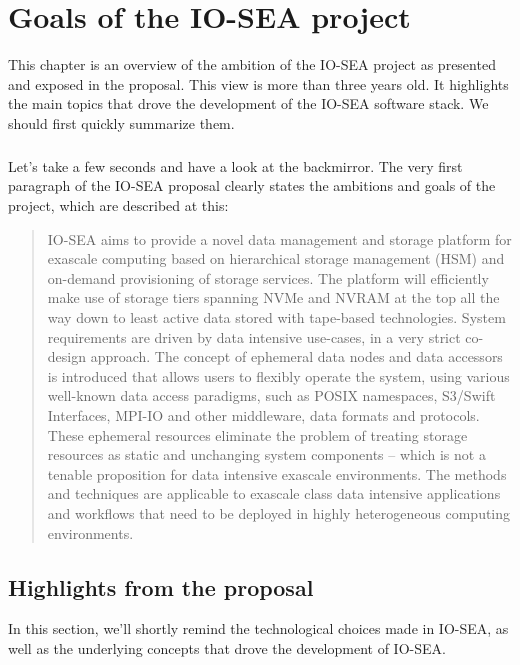 \chapter{Goals of the IO-SEA project}\label{chap:goals}

This chapter is an overview of the ambition of the IO-SEA project as presented and exposed in the proposal.
This view is more than three years old. It highlights the main topics that drove the development of the IO-SEA
software stack. We should first quickly summarize them. 

\paragraph{}
Let's take a few seconds and have a look at the backmirror. The very first paragraph of the IO-SEA proposal 
clearly states the ambitions and goals of the project, which are described at this:

\begin{quotation}
IO-SEA aims to provide a novel data management and storage platform for exascale computing based on hierarchical
storage management (HSM) and on-demand provisioning of storage services. The platform will efficiently make use
of storage tiers spanning NVMe and NVRAM at the top all the way down to least active data stored with tape-based
technologies. System requirements are driven by data intensive use-cases, in a very strict co-design approach.
The concept of ephemeral data nodes and data accessors is introduced that allows users to flexibly operate the
system, using various well-known data access paradigms, such as POSIX namespaces, S3/Swift Interfaces, MPI-IO 
and other middleware, data formats and protocols. These ephemeral resources eliminate the problem of treating
storage resources as static and unchanging system components – which is not a tenable proposition for data
intensive exascale environments. The methods and techniques are applicable to exascale class data intensive
applications and workflows that need to be deployed in highly heterogeneous computing environments.
\end{quotation}

\section{Highlights from the proposal}
In this section, we'll shortly remind the technological choices made in IO-SEA, as well as the underlying
concepts that drove the development of IO-SEA. 

